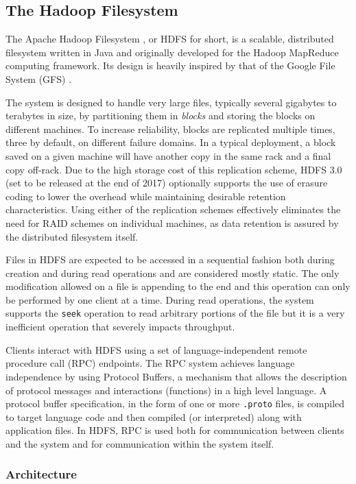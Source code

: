 \subsection{The Hadoop Filesystem}
\label{sec:hdfs}
The Apache Hadoop Filesystem \cite{DBLP:conf/mss/ShvachkoKRC10}, or HDFS for short, is a scalable, distributed filesystem written in Java and originally developed for the Hadoop MapReduce computing framework.
Its design is heavily inspired by that of the Google File System (GFS) \cite{DBLP:conf/sosp/GhemawatGL03}.

The system is designed to handle very large files, typically several gigabytes to terabytes in size, by partitioning them in \emph{blocks} and storing the blocks on different machines.
To increase reliability, blocks are replicated multiple times, three by default, on different failure domains.
In a typical deployment, a block saved on a given machine will have another copy in the same rack and a final copy off-rack.
Due to the high storage cost of this replication scheme, HDFS 3.0 (set to be released at the end of 2017) optionally supports the use of erasure coding to lower the overhead while maintaining desirable retention characteristics.
Using either of the replication schemes effectively eliminates the need for RAID schemes on individual machines, as data retention is assured by the distributed filesystem itself.

Files in HDFS are expected to be accessed in a sequential fashion both during creation and during read operations and are considered mostly static.
The only modification allowed on a file is appending to the end and this operation can only be performed by one client at a time.
During read operations, the system supports the \texttt{seek} operation to read arbitrary portions of the file but it is a very inefficient operation that severely impacts throughput.

Clients interact with HDFS using a set of language-independent remote procedure call (RPC) endpoints.
The RPC system achieves language independence by using Protocol Buffers, a mechanism that allows the description of protocol messages and interactions (functions) in a high level language.
A protocol buffer specification, in the form of one or more \texttt{.proto} files, is compiled to target language code and then compiled (or interpreted) along with application files.
In HDFS, RPC is used both for communication between clients and the system and for communication within the system itself.

\subsubsection{Architecture}

